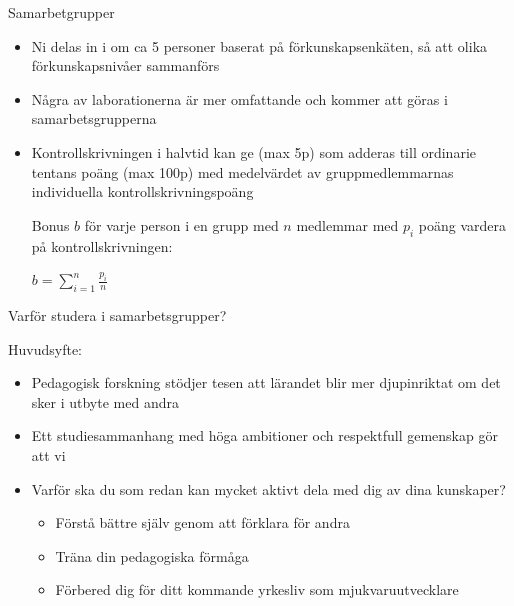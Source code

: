 \begin{Slide}{Samarbetgrupper}\footnotesize
\begin{itemize}
\item Ni delas in i  om ca 5 personer baserat på förkunskapsenkäten, så att olika förkunskapsnivåer sammanförs
\item Några av laborationerna är mer omfattande  och kommer att göras i samarbetsgrupperna \\ \vspace{1em}
\item Kontrollskrivningen i halvtid kan ge  (max 5p) som adderas till ordinarie tentans poäng (max 100p) med medelvärdet av gruppmedlemmarnas individuella kontrollskrivningspoäng 
\scriptsize \parbox{7cm}{Bonus $b$ för varje person i en grupp med $n$ medlemmar med $p_i$ poäng vardera på kontrollskrivningen:} 
 \hspace{5mm} $\displaystyle b = \sum\limits_{i=1}^n \frac{p_i}{n}$
\end{itemize}
\end{Slide}

\fi

\begin{Slide}{Varför studera i samarbetsgrupper?}

Huvudsyfte: 

\begin{itemize}
\item Pedagogisk forskning stödjer tesen att lärandet blir mer djupinriktat om det sker i utbyte med andra
\item Ett studiesammanhang med höga ambitioner och respektfull gemenskap gör att vi 
\item Varför ska du som redan kan mycket aktivt dela med dig av dina kunskaper?
\begin{itemize}
\item Förstå bättre själv genom att förklara för andra
\item Träna din pedagogiska förmåga
\item Förbered dig för ditt kommande yrkesliv som mjukvaruutvecklare 
\end{itemize}
\end{itemize}
\end{Slide}


